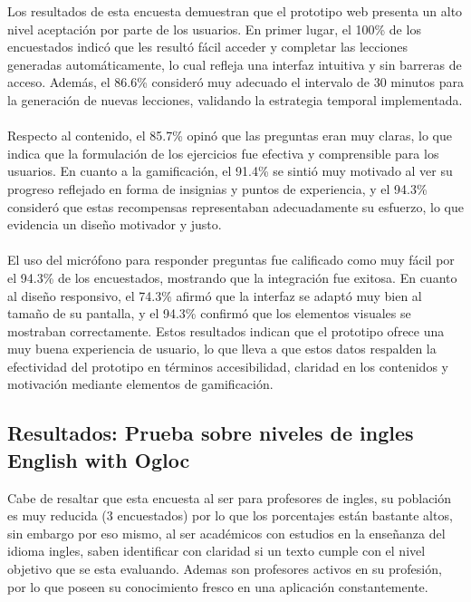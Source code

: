 Los resultados de esta encuesta demuestran que el prototipo web presenta un alto nivel aceptación por parte de los usuarios. En primer lugar, el 100\% de los encuestados indicó que les resultó fácil acceder y completar las lecciones generadas automáticamente, lo cual refleja una interfaz intuitiva y sin barreras de acceso. Además, el 86.6\% consideró muy adecuado el intervalo de 30 minutos para la generación de nuevas lecciones, validando la estrategia temporal implementada.
\\
\\
Respecto al contenido, el 85.7\% opinó que las preguntas eran muy claras, lo que indica que la formulación de los ejercicios fue efectiva y comprensible para los usuarios. En cuanto a la gamificación, el 91.4\% se sintió muy motivado al ver su progreso reflejado en forma de insignias y puntos de experiencia, y el 94.3\% consideró que estas recompensas representaban adecuadamente su esfuerzo, lo que evidencia un diseño motivador y justo.
\\
\\
El uso del micrófono para responder preguntas fue calificado como muy fácil por el 94.3\% de los encuestados, mostrando que la integración fue exitosa. En cuanto al diseño responsivo, el 74.3\% afirmó que la interfaz se adaptó muy bien al tamaño de su pantalla, y el 94.3\% confirmó que los elementos visuales se mostraban correctamente. Estos resultados indican que el prototipo ofrece una muy buena experiencia de usuario, lo que lleva a que estos datos respalden la efectividad del prototipo en términos accesibilidad, claridad en los contenidos y motivación mediante elementos de gamificación.


\subsection{Resultados: Prueba sobre niveles de ingles English with Ogloc}

Cabe de resaltar que esta encuesta al ser para profesores de ingles, su población es muy reducida (3 encuestados) por lo que los porcentajes están bastante altos, sin embargo por eso mismo, al ser académicos con estudios en la enseñanza del idioma ingles, saben identificar con claridad si un texto cumple con el nivel objetivo que se esta evaluando. Ademas son profesores activos en su profesión, por lo que poseen su conocimiento fresco en una aplicación constantemente.

